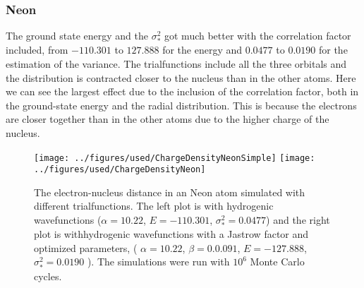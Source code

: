 		
	\subsubsection{Neon}
		The ground state energy and the \(\sigma_*^2\) got much better with the correlation factor included, from \(-110.301\) to \(127.888\) for the energy and  \( 0.0477 \) to \( 0.0190 \) for the estimation of the variance. The trialfunctions include all the three orbitals and the distribution is contracted closer to the nucleus than in the other atoms. Here we can see the largest effect due to the inclusion of the correlation factor, both in the ground-state energy and the radial distribution. This is because the electrons are closer together than in the other atoms due to the higher charge of the nucleus.
		\begin{figure}
			\centering \texttt{[image: ../figures/used/ChargeDensityNeonSimple]}
			\centering \texttt{[image: ../figures/used/ChargeDensityNeon]}
			\protect\caption{The electron-nucleus distance in an Neon atom simulated with different trialfunctions. The left plot is with hydrogenic wavefunctions ($\alpha = 10.22$, $E = -110.301$, $\sigma^2_* = 0.0477$) and the right plot is withhydrogenic wavefunctions with a Jastrow factor and optimized parameters, ( $\alpha = 10.22$, $\beta = 0.0.091$,  $E = -127.888$, $\sigma^2_* = 0.0190$ ). The simulations were run with \(10^6\) Monte Carlo cycles.}
			\label{fig:chargeDensityNeon}
		\end{figure}